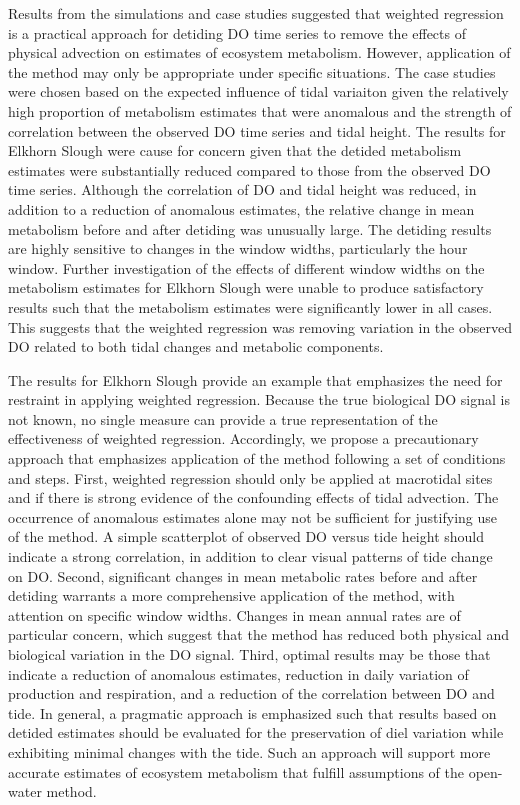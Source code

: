 \documentclass[letterpaper,12pt,oneside]{article}\usepackage[]{graphicx}\usepackage[]{color}
\begin{document}
Results from the simulations and case studies suggested that weighted regression is a practical approach for detiding \ac{DO} time series to remove the effects of physical advection on estimates of ecosystem metabolism.  However, application of the method may only be appropriate under specific situations.  The case studies were chosen based on the expected influence of tidal variaiton given the relatively high proportion of metabolism estimates that were anomalous and the strength of correlation between the observed \ac{DO} time series and tidal height.  The results for Elkhorn Slough were cause for concern given that the detided metabolism estimates were substantially reduced compared to those from the observed \ac{DO} time series.  Although the correlation of \ac{DO} and tidal height was reduced, in addition to a reduction of anomalous estimates, the relative change in mean metabolism before and after detiding was unusually large.  The detiding results are highly sensitive to changes in the window widths, particularly the hour window.  Further investigation of the effects of different window widths on the metabolism estimates for Elkhorn Slough were unable to produce satisfactory results such that the metabolism estimates were significantly lower in all cases.  This suggests that the weighted regression was removing variation in the observed \ac{DO} related to both tidal changes and metabolic components.  

The results for Elkhorn Slough provide an example that emphasizes the need for restraint in applying weighted regression.  Because the true biological \ac{DO} signal is not known, no single measure can provide a true representation of the effectiveness of weighted regression.  Accordingly, we propose a precautionary approach that emphasizes application of the method following a set of conditions and steps.  First, weighted regression should only be applied at macrotidal sites and if there is strong evidence of the confounding effects of tidal advection.  The occurrence of anomalous estimates alone may not be sufficient for justifying use of the method.  A simple scatterplot of observed \ac{DO} versus tide height should indicate a strong correlation, in addition to clear visual patterns of tide change on \ac{DO}.  Second, significant changes in mean metabolic rates before and after detiding warrants a more comprehensive application of the method, with attention on specific window widths.  Changes in mean annual rates are of particular concern, which suggest that the method has reduced both physical and biological variation in the \ac{DO} signal.  Third, optimal results may be those that indicate a reduction of anomalous estimates, reduction in daily variation of production and respiration, and a reduction of the correlation between \ac{DO} and tide.  In general, a pragmatic approach is emphasized such that results based on detided estimates should be evaluated for the preservation of diel variation while exhibiting minimal changes with the tide.  Such an approach will support more accurate estimates of ecosystem metabolism that fulfill assumptions of the open-water method.  
\end{document}
